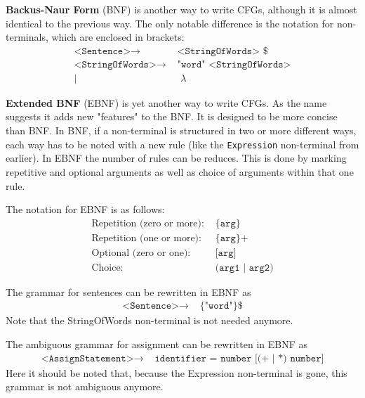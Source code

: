 \textbf{Backus-Naur Form} (BNF) is another way to write CFGs, although it is almost identical to the previous way. The only notable difference is the notation for non-terminals, which are enclosed in brackets:
\begin{align*}
	\texttt{<Sentence>}\to & \texttt{ <StringOfWords> \$}\\
	\texttt{<StringOfWords>}\to & \texttt{ "word" <StringOfWords>}\\
	| & \texttt{ }\lambda
\end{align*}

\textbf{Extended BNF} (EBNF) is yet another way to write CFGs. As the name suggests it adds new "features" to the BNF.
It is designed to be more concise than BNF.
In BNF, if a non-terminal is structured in two or more different ways, each way has to be noted with a new rule (like the \texttt{Expression} non-terminal from earlier).
In EBNF the number of rules can be reduces.
This is done by marking repetitive and optional arguments as well as choice of arguments within that one rule.

The notation for EBNF is as follows:
\begin{align*}
	\text{Repetition (zero or more):} & \texttt{ \{arg\}}\\
	\text{Repetition (one or more):} & \texttt{ \{arg\}+}\\
	\text{Optional (zero or one):} & \texttt{ [arg]}\\
	\text{Choice:} & \texttt{ (arg1 | arg2)}
\end{align*}

The grammar for sentences can be rewritten in EBNF as
\begin{align*}
	\texttt{<Sentence>}\to & \texttt{ \{"word"\} \$}
\end{align*}
Note that the StringOfWords non-terminal is not needed anymore.

The ambiguous grammar for assignment can be rewritten in EBNF as
\begin{align*}
	\texttt{<AssignStatement>}\to & \texttt{ identifier = number [(+ | *) number]}
\end{align*}
Here it should be noted that, because the Expression non-terminal is gone, this grammar is not ambiguous anymore.